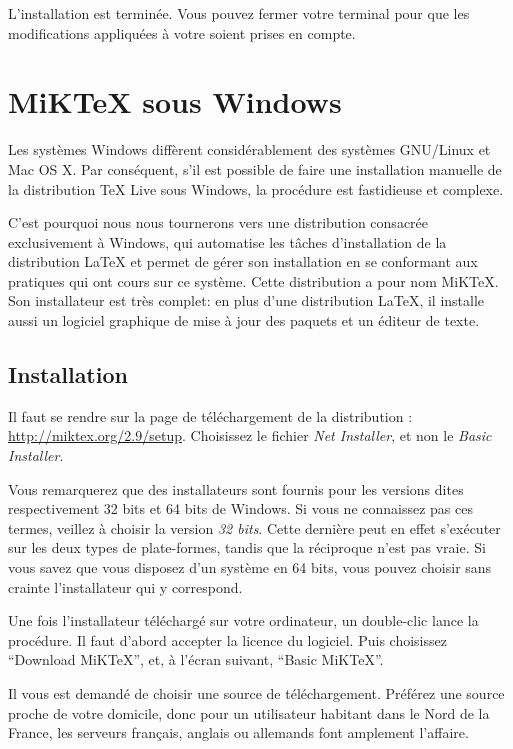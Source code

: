 L'installation est terminée. Vous pouvez fermer votre terminal pour que les modifications appliquées à votre  soient prises en compte. 


\section{MiKTeX sous Windows}


Les systèmes Windows diffèrent considérablement des systèmes GNU/Linux et Mac OS X. Par conséquent, s'il est possible de faire une installation manuelle de la distribution TeX Live sous Windows, la procédure est fastidieuse et complexe.

C'est pourquoi nous nous tournerons vers une distribution consacrée exclusivement à Windows, qui automatise les tâches d'installation de la distribution \LaTeX{} et permet de gérer son installation en se conformant aux pratiques qui ont cours sur ce système. Cette distribution a pour nom MiKTeX. Son installateur est très complet: en plus d'une distribution \LaTeX{}, il installe aussi un logiciel graphique de mise à jour des paquets et un éditeur de texte.

\subsection{Installation}

Il faut se rendre sur la page de téléchargement de la distribution : \url{http://miktex.org/2.9/setup}. Choisissez le fichier \emph{Net Installer}, et non le \emph{Basic Installer}.

\begin{attention}
Vous remarquerez que des installateurs sont fournis pour les versions dites respectivement 32 bits et 64 bits de Windows. Si vous ne connaissez pas ces termes, veillez à choisir la version \emph{32 bits}. Cette dernière peut en effet s'exécuter sur les deux types de plate-formes, tandis que la réciproque n'est pas vraie. Si vous savez que vous disposez d'un système en 64 bits, vous pouvez choisir sans crainte l'installateur qui y correspond.
\end{attention}

Une fois l'installateur téléchargé sur votre ordinateur, un double-clic lance la procédure. Il faut d'abord accepter la licence du logiciel. Puis choisissez \enquote{Download MiKTeX}, et, à l'écran suivant, \enquote{Basic MiKTeX}.

Il vous est demandé de choisir une source de téléchargement. Préférez une source proche de votre domicile, donc pour un utilisateur habitant dans le Nord de la France, les serveurs français, anglais ou allemands font amplement l'affaire.

